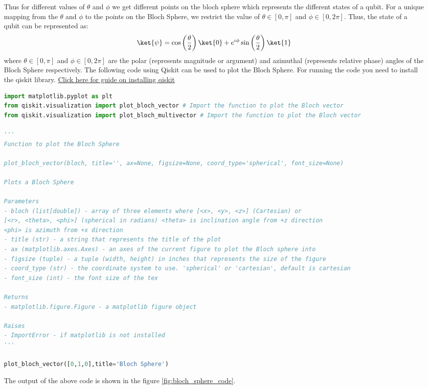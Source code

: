 \documentclass[12pt, oneside]{book}
\theoremstyle{definition}
\theoremstyle{definition}
\theoremstyle{remark}
\begin{document}
Thus for different values of $\theta$ and $\phi$ we get different points on the bloch sphere which
represents the different states of a qubit. For a unique mapping from the $\theta$ and $\phi$ to the points on the Bloch Sphere,
we restrict the value of $\theta \in [0,\pi]$ and $\phi \in [0,2\pi]$. 
Thus, the state of a qubit can be represented as:
\[
    \ket{\psi}=\cos\left(\frac{\theta}{2}\right)\ket{0}+e^{\iota \phi}\sin\left(\frac{\theta}{2}\right)\ket{1}
\]
where $\theta \in [0,\pi]$ and $\phi \in [0,2\pi]$ are the polar (represents magnitude or argument) and azimuthal (represents relative phase) angles of the Bloch Sphere respectively.
The following code using Qiskit can be used to plot the Bloch Sphere.
For running the code you need to install the qiskit library. 
\href{https://docs.quantum.ibm.com/start/install}{Click here for guide on installing qiskit}
\begin{lstlisting}[language=Python]
import matplotlib.pyplot as plt
from qiskit.visualization import plot_bloch_vector # Import the function to plot the Bloch vector
from qiskit.visualization import plot_bloch_multivector # Import the function to plot the Bloch vector

'''
Function to plot the Bloch Sphere

plot_bloch_vector(bloch, title='', ax=None, figsize=None, coord_type='spherical', font_size=None)

Plots a Bloch Sphere

Parameters
- bloch (list[double]) - array of three elements where [<x>, <y>, <z>] (Cartesian) or 
[<r>, <theta>, <phi>] (spherical in radians) <theta> is inclination angle from +z direction 
<phi> is azimuth from +x direction
- title (str) - a string that represents the title of the plot
- ax (matplotlib.axes.Axes) - an axes of the current figure to plot the Bloch sphere into
- figsize (tuple) - a tuple (width, height) in inches that represents the size of the figure
- coord_type (str) - the coordinate system to use. 'spherical' or 'cartesian', default is cartesian
- font_size (int) - the font size of the tex

Returns
- matplotlib.figure.Figure - a matplotlib figure object

Raises
- ImportError - if matplotlib is not installed
'''

plot_bloch_vector([0,1,0],title='Bloch Sphere')
\end{lstlisting}
The output of the above code is shown in the figure \ref{fig:bloch_sphere_code}.
\end{document}
